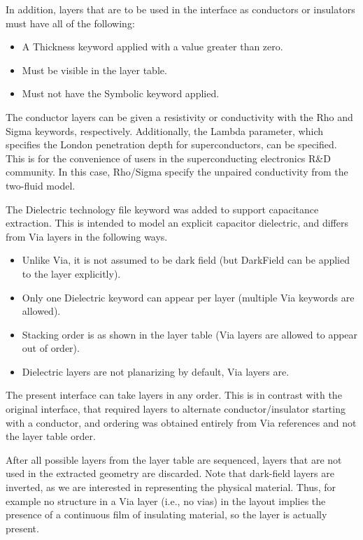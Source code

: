 In addition, layers that are to be used in the interface as conductors
or insulators must have all of the following:

\begin{itemize}
\item{A {\et Thickness} keyword applied with a value greater than
zero.}

\item{Must be visible in the layer table.}

\item{Must not have the {\et Symbolic} keyword applied.}
\end{itemize}

The conductor layers can be given a resistivity or conductivity with
the {\et Rho} and {\et Sigma} keywords, respectively.  Additionally,
the {\et Lambda} parameter, which specifies the London penetration
depth for superconductors, can be specified.  This is for the
convenience of {\Xic} users in the superconducting electronics R\&D
community.  In this case, {\et Rho}/{\et Sigma} specify the unpaired
conductivity from the two-fluid model.

The {\et Dielectric} technology file keyword was added to support
capacitance extraction.  This is intended to model an explicit
capacitor dielectric, and differs from {\et Via} layers in the
following ways.

\begin{itemize}
\item{Unlike {\et Via}, it is not assumed to be dark field (but {\et
DarkField} can be applied to the layer explicitly).}

\item{Only one {\et Dielectric} keyword can appear per layer (multiple
{\et Via} keywords are allowed).}

\item{Stacking order is as shown in the layer table ({\et Via} layers
are allowed to appear out of order).}

\item{{\et Dielectric} layers are not planarizing by default, {\et
Via} layers are.}
\end{itemize}

The present interface can take layers in any order.  This is in
contrast with the original interface, that required layers to
alternate conductor/insulator starting with a conductor, and ordering
was obtained entirely from {\et Via} references and not the layer
table order.

After all possible layers from the layer table are sequenced, layers
that are not used in the extracted geometry are discarded.  Note that
dark-field layers are inverted, as we are interested in representing
the physical material.  Thus, for example no structure in a {\et Via}
layer (i.e., no vias) in the layout implies the presence of a
continuous film of insulating material, so the layer is actually
present.

